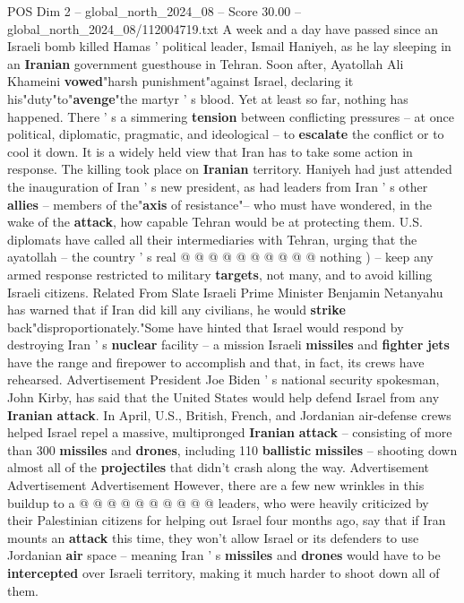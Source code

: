 \begin{textsample}{POS Dim 2 – global\_north\_2024\_08 – Score 30.00 – global\_north\_2024\_08/112004719.txt}  \label{ex:f2_pos_085}
A week and a day have passed since an Israeli bomb killed Hamas ' political leader, Ismail Haniyeh, as he lay sleeping in an \textbf{Iranian} government guesthouse in Tehran.
Soon after, Ayatollah Ali Khameini \textbf{vowed}"harsh punishment"against Israel, declaring it his"duty"to"\textbf{avenge}"the martyr ' s blood.
Yet at least so far, nothing has happened.
There ' s a simmering \textbf{tension} between conflicting pressures -- at once political, diplomatic, pragmatic, and ideological -- to \textbf{escalate} the conflict or to cool it down.
It is a widely held view that Iran has to take some action in response.
The killing took place on \textbf{Iranian} territory.
Haniyeh had just attended the inauguration of Iran ' s new president, as had leaders from Iran ' s other \textbf{allies} -- members of the"\textbf{axis} of resistance"-- who must have wondered, in the wake of the \textbf{attack}, how capable Tehran would be at protecting them.
U.S. diplomats have called all their intermediaries with Tehran, urging that the ayatollah -- the country ' s real @ @ @ @ @ @ @ @ @ @ nothing ) -- keep any armed response restricted to military \textbf{targets}, not many, and to avoid killing Israeli citizens.
Related From Slate Israeli Prime Minister Benjamin Netanyahu has warned that if Iran did kill any civilians, he would \textbf{strike} back"disproportionately."Some have hinted that Israel would respond by destroying Iran ' s \textbf{nuclear} facility -- a mission Israeli \textbf{missiles} and \textbf{fighter} \textbf{jets} have the range and firepower to accomplish and that, in fact, its crews have rehearsed.
Advertisement President Joe Biden ' s national security spokesman, John Kirby, has said that the United States would help defend Israel from any \textbf{Iranian} \textbf{attack}.
In April, U.S., British, French, and Jordanian air-defense crews helped Israel repel a massive, multipronged \textbf{Iranian} \textbf{attack} -- consisting of more than 300 \textbf{missiles} and \textbf{drones}, including 110 \textbf{ballistic} \textbf{missiles} -- shooting down almost all of the \textbf{projectiles} that didn't crash along the way.
Advertisement Advertisement Advertisement However, there are a few new wrinkles in this buildup to a @ @ @ @ @ @ @ @ @ @ leaders, who were heavily criticized by their Palestinian citizens for helping out Israel four months ago, say that if Iran mounts an \textbf{attack} this time, they won't allow Israel or its defenders to use Jordanian \textbf{air} space -- meaning Iran ' s \textbf{missiles} and \textbf{drones} would have to be \textbf{intercepted} over Israeli territory, making it much harder to shoot down all of them.

\end{textsample}
